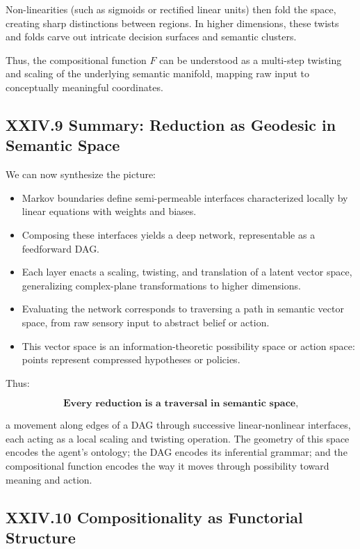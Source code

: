 \documentclass[12pt,letterpaper]{article}
\begin{document}
Non-linearities (such as sigmoids or rectified linear units) then fold the space, creating sharp distinctions between regions. In higher dimensions, these twists and folds carve out intricate decision surfaces and semantic clusters.

Thus, the compositional function $F$ can be understood as a multi-step twisting and scaling of the underlying semantic manifold, mapping raw input to conceptually meaningful coordinates.

\subsection{XXIV.9 Summary: Reduction as Geodesic in Semantic Space}

We can now synthesize the picture:

\begin{itemize}
    \item Markov boundaries define semi-permeable interfaces characterized locally by linear equations with weights and biases.
    \item Composing these interfaces yields a deep network, representable as a feedforward DAG.
    \item Each layer enacts a scaling, twisting, and translation of a latent vector space, generalizing complex-plane transformations to higher dimensions.
    \item Evaluating the network corresponds to traversing a path in semantic vector space, from raw sensory input to abstract belief or action.
    \item This vector space is an information-theoretic possibility space or action space: points represent compressed hypotheses or policies.
\end{itemize}

Thus:

\[
\textbf{Every reduction is a traversal in semantic space,} 
\]

a movement along edges of a DAG through successive linear-nonlinear interfaces, each acting as a local scaling and twisting operation. The geometry of this space encodes the agent’s ontology; the DAG encodes its inferential grammar; and the compositional function encodes the way it moves through possibility toward meaning and action.
\subsection{XXIV.10 Compositionality as Functorial Structure}
\end{document}
